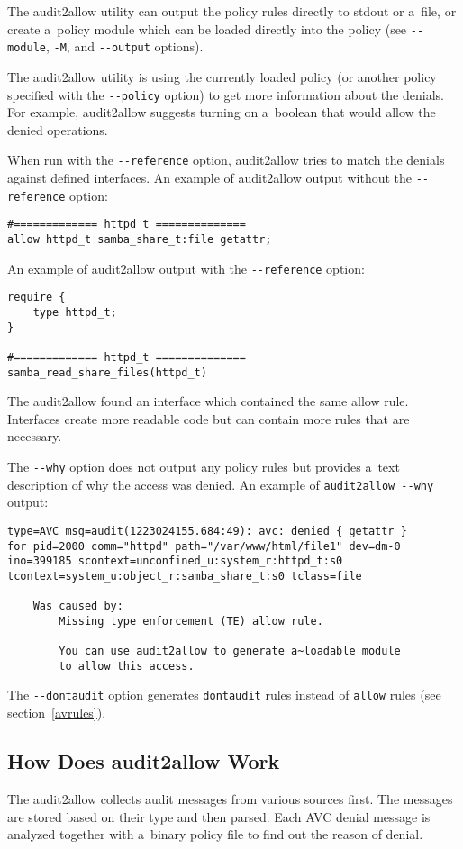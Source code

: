 The audit2allow utility can output the policy rules directly to stdout or
a~file, or create a~policy module which can be loaded directly into the policy
(see \texttt{-{}-module}, \texttt{-M}, and \texttt{-{}-output} options).

The audit2allow utility is using the currently loaded policy (or another policy
specified with the \texttt{-{}-policy} option) to get more information about the
denials. For example, audit2allow suggests turning on a~boolean that would allow
the denied operations.

When run with the \texttt{-{}-reference} option, audit2allow tries to match the
denials against defined interfaces. An example of audit2allow output without the
\texttt{-{}-reference} option:
\begin{lstlisting}
#============= httpd_t ==============
allow httpd_t samba_share_t:file getattr;
\end{lstlisting}
An example of audit2allow output with the \texttt{-{}-reference} option:
\begin{lstlisting}
require {
	type httpd_t;
}

#============= httpd_t ==============
samba_read_share_files(httpd_t)
\end{lstlisting}
The audit2allow found an interface which contained the same allow rule.
Interfaces create more readable code but can contain more rules that are
necessary.

The \texttt{-{}-why} option does not output any policy rules but provides a~text
description of why the access was denied. An example of \texttt{audit2allow
-{}-why} output:
\begin{lstlisting}
type=AVC msg=audit(1223024155.684:49): avc: denied { getattr }
for pid=2000 comm="httpd" path="/var/www/html/file1" dev=dm-0
ino=399185 scontext=unconfined_u:system_r:httpd_t:s0
tcontext=system_u:object_r:samba_share_t:s0 tclass=file

    Was caused by:
        Missing type enforcement (TE) allow rule.

        You can use audit2allow to generate a~loadable module
        to allow this access.
\end{lstlisting}

The \texttt{-{}-dontaudit} option generates \texttt{dontaudit} rules instead of
\texttt{allow} rules (see section~\ref{avrules}).

\subsection{How Does audit2allow Work}
The audit2allow collects audit messages from various sources first. The messages
are stored based on their type and then parsed. Each AVC denial message is
analyzed together with a~binary policy file to find out the reason of denial.


